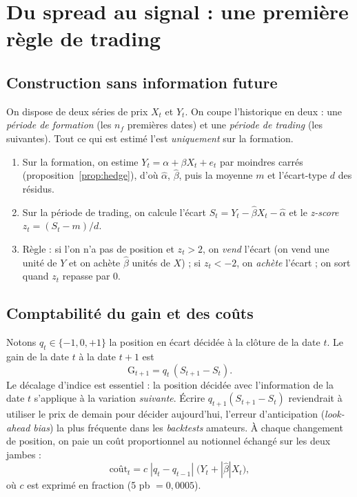 \documentclass[11pt,a4paper]{article}
\begin{document}
\section{Du spread au signal : une première règle de trading}

\subsection{Construction sans information future}

On dispose de deux séries de prix $X_t$ et $Y_t$. On coupe l'historique en deux : une \emph{période de formation} (les $n_f$ premières dates) et une \emph{période de trading} (les suivantes). Tout ce qui est estimé l'est \emph{uniquement} sur la formation.
\begin{enumerate}
\item Sur la formation, on estime $Y_t = \alpha + \beta X_t + e_t$ par moindres carrés (proposition~\ref{prop:hedge}), d'où $\hat\alpha$, $\hat\beta$, puis la moyenne $m$ et l'écart-type $d$ des résidus.
\item Sur la période de trading, on calcule l'écart $S_t = Y_t - \hat\beta X_t - \hat\alpha$ et le \emph{z-score} $z_t = (S_t - m)/d$.
\item Règle : si l'on n'a pas de position et $z_t > 2$, on \emph{vend} l'écart (on vend une unité de $Y$ et on achète $\hat\beta$ unités de $X$) ; si $z_t < -2$, on \emph{achète} l'écart ; on sort quand $z_t$ repasse par 0.
\end{enumerate}

\subsection{Comptabilité du gain et des coûts}

Notons $q_t \in \{-1, 0, +1\}$ la position en écart décidée à la clôture de la date $t$. Le gain de la date $t$ à la date $t+1$ est
\[
\text{G}_{t+1} = q_t\,(S_{t+1} - S_t).
\]
Le décalage d'indice est essentiel : la position décidée avec l'information de la date $t$ s'applique à la variation \emph{suivante}. Écrire $q_{t+1}(S_{t+1}-S_t)$ reviendrait à utiliser le prix de demain pour décider aujourd'hui, l'erreur d'anticipation (\emph{look-ahead bias}) la plus fréquente dans les \emph{backtests} amateurs. À chaque changement de position, on paie un coût proportionnel au notionnel échangé sur les deux jambes :
\[
\text{coût}_t = c\;|q_t - q_{t-1}|\;\big(Y_t + |\hat\beta|X_t\big),
\]
où $c$ est exprimé en fraction (5 pb $= 0{,}0005$).
\end{document}
